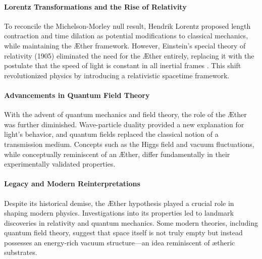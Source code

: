     \paragraph*{Lorentz Transformations and the Rise of Relativity}
    To reconcile the Michelson-Morley null result, Hendrik Lorentz proposed length contraction and time dilation as potential modifications to classical mechanics, while maintaining the Æther framework. However, Einstein’s special theory of relativity (1905) eliminated the need for the Æther entirely, replacing it with the postulate that the speed of light is constant in all inertial frames \cite{einstein1905}. This shift revolutionized physics by introducing a relativistic spacetime framework.

    \paragraph*{Advancements in Quantum Field Theory}
    With the advent of quantum mechanics and field theory, the role of the Æther was further diminished. Wave-particle duality provided a new explanation for light’s behavior, and quantum fields replaced the classical notion of a transmission medium. Concepts such as the Higgs field \cite{higgs1964} and vacuum fluctuations, while conceptually reminiscent of an Æther, differ fundamentally in their experimentally validated properties.

    \paragraph*{Legacy and Modern Reinterpretations}
    Despite its historical demise, the Æther hypothesis played a crucial role in shaping modern physics. Investigations into its properties led to landmark discoveries in relativity and quantum mechanics. Some modern theories, including quantum field theory, suggest that space itself is not truly empty but instead possesses an energy-rich vacuum structure—an idea reminiscent of ætheric substrates.